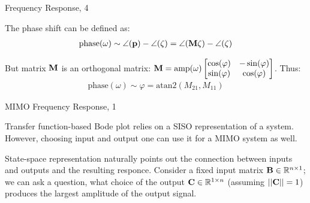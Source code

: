 \documentclass{beamer}
\begin{document}
\begin{frame}{Frequency Response, 4}
	\begin{flushleft}
		
		The phase shift can be defined as:
		\begin{align}
			\text{phase}(\omega)
			\sim 
			\angle (\mathbf{p}) - \angle (\zeta)
			=
			\angle (\mathbf{M} \zeta) - \angle (\zeta)
		\end{align}		
		
		But matrix $\mathbf{M}$ is an orthogonal matrix:  $\mathbf{M} = \text{amp}(\omega)
		\begin{bmatrix}
			\cos(\varphi) & -\sin(\varphi) \\
			\sin(\varphi) & \cos(\varphi)
		\end{bmatrix}$. Thus:
		\begin{align}
			\text{phase}(\omega)
			\sim 
			\varphi = \text{atan2}(M_{21}, M_{11})
		\end{align}		
		
	\end{flushleft}
\end{frame}



\begin{frame}{MIMO Frequency Response, 1}
	\begin{flushleft}
		
		Transfer function-based Bode plot relies on a SISO representation of a system. However, choosing input and output one can use it for a MIMO system as well. 
		
		\bigskip
		
		State-space representation naturally points out the connection between inputs and outputs and the resulting responce. Consider a fixed input matrix $\mathbf{B} \in \mathbb{R}^{n \times 1}$; we can ask a question, what choice of the output $\mathbf{C} \in \mathbb{R}^{1 \times n}$ (assuming $||\mathbf{C} || = 1$) produces the largest amplitude of the output signal.
		
	\end{flushleft}
\end{frame}
\end{document}
